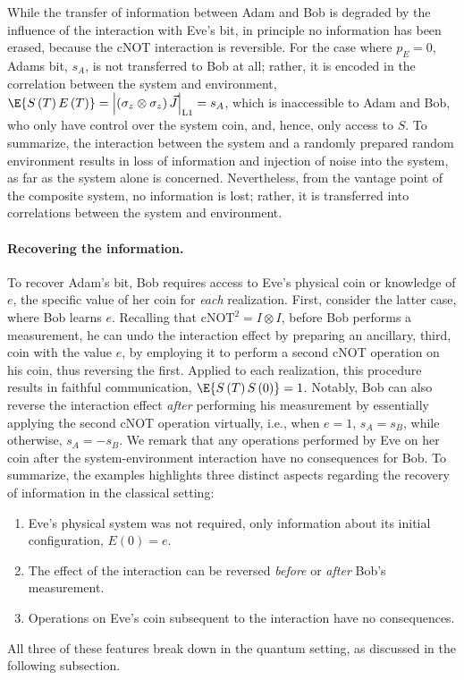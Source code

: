 While the transfer of information between Adam and Bob is degraded
by the influence of the interaction with Eve's bit, in principle no
information has been erased, because the cNOT interaction is reversible.
For the case where $p_{E}=0$, Adams bit, $s_{A}$, is not transferred
to Bob at all; rather, it is encoded in the correlation between the
system and environment, $\E{S\left(T\right)E\left(T\right)}=\left|\left(\sigma_{z}\otimes\sigma_{z}\right)\vec{J}\right|_{\mathrm{L1}}=s_{A}$,
which is inaccessible to Adam and Bob, who only have control over
the system coin, and, hence, only access to $S$. To summarize, the
interaction between the system and a randomly prepared random environment
results in loss of information and injection of noise into the system,
as far as the system alone is concerned. Nevertheless, from the vantage
point of the composite system, no information is lost; rather, it
is transferred into correlations between the system and environment. 

\paragraph{Recovering the information.}

To recover Adam's bit, Bob requires access to Eve's physical coin
or knowledge of $e$, the specific value of her coin for \emph{each}
realization. First, consider the latter case, where Bob learns $e$.
Recalling that $\mathrm{cNOT}^{2}=I\otimes I$, before Bob performs
a measurement, he can undo the interaction effect by preparing an
ancillary, third, coin with the value $e$, by employing it to perform
a second cNOT operation on his coin, thus reversing the first. Applied
to each realization, this procedure results in faithful communication,
$\E{S\left(T\right)S\left(0\right)}=1$. Notably, Bob can also reverse
the interaction effect\emph{ after} performing his measurement by
essentially applying the second cNOT operation virtually, i.e., when
$e=1$, $s_{A}=s_{B}$, while otherwise, $s_{A}=-s_{B}$. We remark
that any operations performed by Eve on her coin after the system-environment
interaction have no consequences for Bob. To summarize, the examples
highlights three distinct aspects regarding the recovery of information
in the classical setting:
\begin{enumerate}
\item Eve's physical system was not required, only information about its
initial configuration, $E\left(0\right)=e$.
\item The effect of the interaction can be reversed \emph{before} or \emph{after}
Bob's measurement. 
\item Operations on Eve's coin subsequent to the interaction have no consequences.
\end{enumerate}
All three of these features break down in the quantum setting, as
discussed in the following subsection. 

